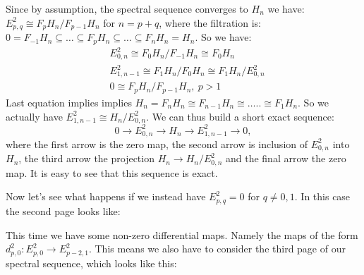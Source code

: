 \documentclass{article}
\begin{document}
\noindent
Since by assumption, the spectral sequence converges to $H_n$ we have:
$E^2_{p,q} \cong F_p H_n / F_{p-1} H_n$ for $n=p+q$,
where the filtration is:
$0 = F_{-1} H_n \subseteq \dots \subseteq F_p H_n \subseteq \dots \subseteq F_n H_n = H_n$.
So we have: 
\begin{align*}
&E^2_{0,n} \cong F_0 H_n / F_{-1} H_n \cong F_0 H_n \\
&E^2_{1,n-1} \cong F_1 H_n / F_0 H_n \cong F_1 H_n / E^2_{0,n} \\
& 0 \cong F_p H_n / F_{p-1} H_n, \  p>1
\end{align*}
Last equation implies implies $H_n = F_n H_n \cong F_{n-1} H_n \cong \dots .. \cong F_1 H_n$.
So we actually have $E^2_{1,n-1} \cong H_n / E_{0,n}^2$. We can thus build a short exact sequence:
\begin{equation*}
0 \to E_{0,n}^2 \to H_n \to E_{1,n-1}^2 \to 0,
\end{equation*}
where the first arrow is the zero map, the second arrow is inclusion of $E_{0,n}^2$ into $H_n$, the third arrow the projection $H_n \to H_n/E_{0,n}^2$ and the final arrow the zero map. It is easy to see that this sequence is exact.


Now let's see what happens if we instead have $E^2_{p,q} = 0$ for $q \neq 0,1$. In this case the second page looks like:

\begin{center}\end{center}

This time we have some non-zero differential maps. Namely the maps of the form $d^2_{p,0}: E^2_{p,0} \to E^2_{p-2,1}$.
This means we also have to consider the third page of our spectral sequence, which looks like this:
\end{document}
